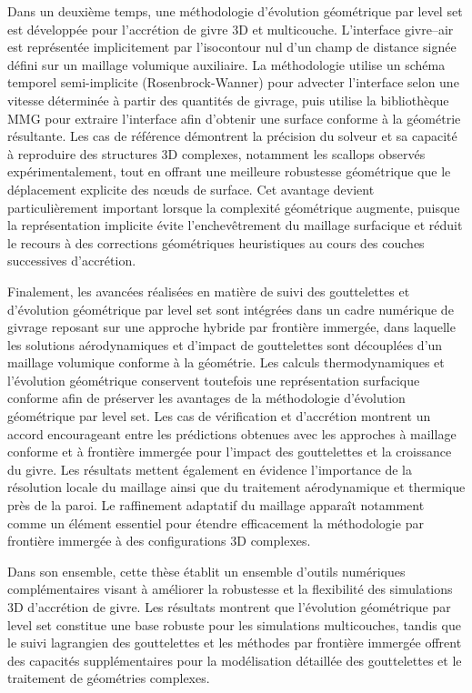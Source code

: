 Dans un deuxième temps, une méthodologie d’évolution géométrique par level set est développée pour l'accrétion de givre 3D et multicouche. L'interface givre--air est représentée implicitement par l'isocontour nul d'un champ de distance signée défini sur un maillage volumique auxiliaire. La méthodologie utilise un schéma temporel semi-implicite (Rosenbrock-Wanner) pour advecter l’interface selon une vitesse déterminée à partir des quantités de givrage, puis utilise la bibliothèque MMG pour extraire l’interface afin d’obtenir une surface conforme à la géométrie résultante. Les cas de référence démontrent la précision du solveur et sa capacité à reproduire des structures 3D complexes, notamment les scallops observés expérimentalement, tout en offrant une meilleure robustesse géométrique que le déplacement explicite des nœuds de surface. Cet avantage devient particulièrement important lorsque la complexité géométrique augmente, puisque la représentation implicite évite l'enchevêtrement du maillage surfacique et réduit le recours à des corrections géométriques heuristiques au cours des couches successives d'accrétion.

Finalement, les avancées réalisées en matière de suivi des gouttelettes et d'évolution géométrique par level set sont intégrées dans un cadre numérique de givrage reposant sur une approche hybride par frontière immergée, dans laquelle les solutions aérodynamiques et d'impact de gouttelettes sont découplées d'un maillage volumique conforme à la géométrie. Les calculs thermodynamiques et l'évolution géométrique conservent toutefois une représentation surfacique conforme afin de préserver les avantages de la méthodologie d'évolution géométrique par level set. Les cas de vérification et d'accrétion montrent un accord encourageant entre les prédictions obtenues avec les approches à maillage conforme et à frontière immergée pour l'impact des gouttelettes et la croissance du givre. Les résultats mettent également en évidence l'importance de la résolution locale du maillage ainsi que du traitement aérodynamique et thermique près de la paroi. Le raffinement adaptatif du maillage apparaît notamment comme un élément essentiel pour étendre efficacement la méthodologie par frontière immergée à des configurations 3D complexes.

Dans son ensemble, cette thèse établit un ensemble d'outils numériques complémentaires visant à améliorer la robustesse et la flexibilité des simulations 3D d'accrétion de givre. Les résultats montrent que l'évolution géométrique par level set constitue une base robuste pour les simulations multicouches, tandis que le suivi lagrangien des gouttelettes et les méthodes par frontière immergée offrent des capacités supplémentaires pour la modélisation détaillée des gouttelettes et le traitement de géométries complexes.